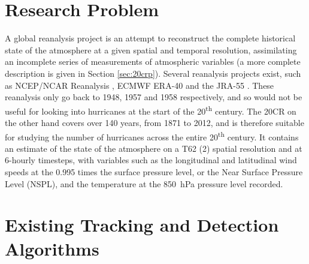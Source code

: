 \documentclass[pdftex,12pt,a4paper]{report}
\newcommand{\ts}{\textsuperscript}
\begin{document}
\section{Research Problem}


A global reanalysis project is an attempt to reconstruct the complete historical state of the
atmosphere at a given spatial and temporal resolution, assimilating an incomplete series of
measurements of atmospheric variables (a more complete description is given in Section
\ref{sec:20crp}). %
Several reanalysis projects exist, such as NCEP/NCAR Reanalysis \parencite{kalnay1996ncep,
kistler2001ncep}, ECMWF ERA-40 \parencite{uppala2005era} and the JRA-55
\parencite{ebita2011japanese}. These reanalysis only go back to 1948, 1957 and 1958  respectively,
and so would not be useful for looking into hurricanes at the start of the 20\ts{th} century. The
20CR on the other hand covers over 140 years, from 1871 to 2012, and is therefore suitable for
studying the number of hurricanes across the entire 20\ts{th} century. It contains an estimate of
the state of the atmosphere on a T62 (2\textdegree) spatial resolution and at 6-hourly timesteps,
with variables such as the longitudinal and latitudinal wind speeds at the 0.995 times the surface
pressure level, or the Near Surface Pressure Level (NSPL), and the temperature at the \SI{850}{hPa}
pressure level recorded.

\section{Existing Tracking and Detection Algorithms}

\end{document}
